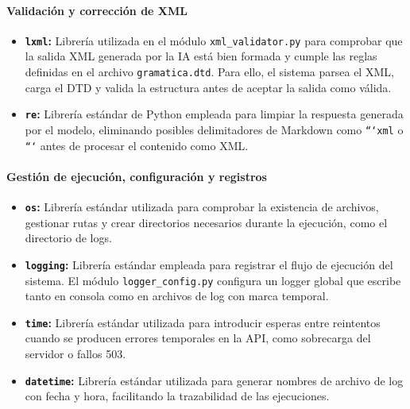 \paragraph{Validación y corrección de XML}

\begin{itemize}
    \item \textbf{\texttt{lxml}:} Librería utilizada en el módulo \texttt{xml\_validator.py} para comprobar que la salida XML generada por la IA está bien formada y cumple las reglas definidas en el archivo \texttt{gramatica.dtd}. Para ello, el sistema parsea el XML, carga el DTD y valida la estructura antes de aceptar la salida como válida.

    \item \textbf{\texttt{re}:} Librería estándar de Python empleada para limpiar la respuesta generada por el modelo, eliminando posibles delimitadores de Markdown como \texttt{```xml} o \texttt{```} antes de procesar el contenido como XML.
\end{itemize}

\paragraph{Gestión de ejecución, configuración y registros}

\begin{itemize}
    \item \textbf{\texttt{os}:} Librería estándar utilizada para comprobar la existencia de archivos, gestionar rutas y crear directorios necesarios durante la ejecución, como el directorio de logs.

    \item \textbf{\texttt{logging}:} Librería estándar empleada para registrar el flujo de ejecución del sistema. El módulo \texttt{logger\_config.py} configura un logger global que escribe tanto en consola como en archivos de log con marca temporal.

    \item \textbf{\texttt{time}:} Librería estándar utilizada para introducir esperas entre reintentos cuando se producen errores temporales en la API, como sobrecarga del servidor o fallos 503.

    \item \textbf{\texttt{datetime}:} Librería estándar utilizada para generar nombres de archivo de log con fecha y hora, facilitando la trazabilidad de las ejecuciones.
\end{itemize}
    

